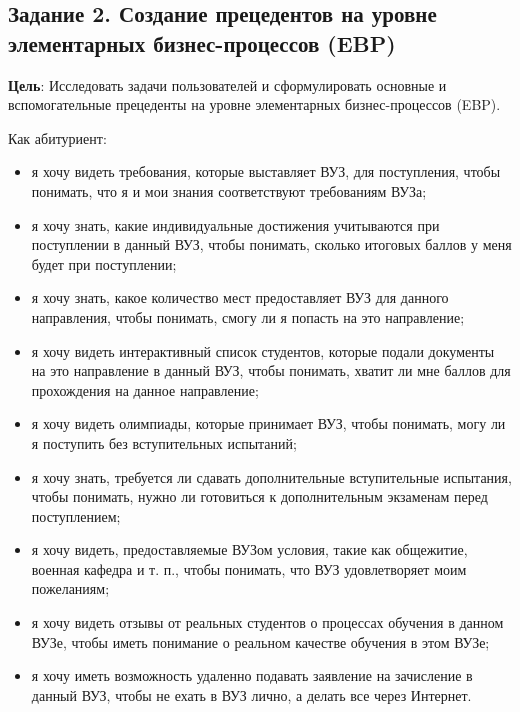 \documentclass[a4paper, 14pt]{extarticle}
\begin{document}
\subsection*{
  Задание 2. Создание прецедентов на уровне элементарных бизнес-процессов (EBP)
}

\textbf{Цель}: Исследовать задачи пользователей и сформулировать основные и
вспомогательные прецеденты на уровне элементарных бизнес-процессов (EBP).

Как абитуриент:
\begin{itemize}
  \item я хочу видеть требования, которые выставляет ВУЗ, для поступления, чтобы
  понимать, что я и мои знания соответствуют требованиям ВУЗа;
  \item я хочу знать, какие индивидуальные достижения учитываются при
  поступлении в данный ВУЗ, чтобы понимать, сколько итоговых баллов у меня будет
  при поступлении;
  \item я хочу знать, какое количество мест предоставляет ВУЗ для данного
  направления, чтобы понимать, смогу ли я попасть на это направление;
  \item я хочу видеть интерактивный список студентов, которые подали документы
  на это направление в данный ВУЗ, чтобы понимать, хватит ли мне баллов для
  прохождения на данное направление;
  \item я хочу видеть олимпиады, которые принимает ВУЗ, чтобы понимать, могу ли
  я поступить без вступительных испытаний;
  \item я хочу знать, требуется ли сдавать дополнительные вступительные
  испытания, чтобы понимать, нужно ли готовиться к дополнительным экзаменам
  перед поступлением;
  \item я хочу видеть, предоставляемые ВУЗом условия, такие как общежитие,
  военная кафедра и т. п., чтобы понимать, что ВУЗ удовлетворяет моим
  пожеланиям;
  \item я хочу видеть отзывы от реальных студентов о процессах обучения в данном
  ВУЗе, чтобы иметь понимание о реальном качестве обучения в этом ВУЗе;
  \item я хочу иметь возможность удаленно подавать заявление на зачисление в
  данный ВУЗ, чтобы не ехать в ВУЗ лично, а делать все через Интернет.
\end{itemize}
\end{document}
